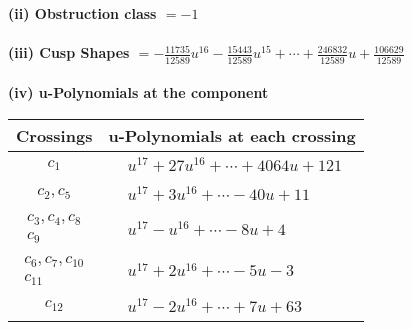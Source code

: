 \documentclass[1p]{elsarticle_modified}
\theoremstyle{definition}
\begin{document}
\flushleft \textbf{(ii) Obstruction class $= -1$}\\~\\
\flushleft \textbf{(iii) Cusp Shapes $= -\frac{11735}{12589} u^{16}-\frac{15443}{12589} u^{15}+\cdots+\frac{246832}{12589} u+\frac{106629}{12589}$}\\~\\
\newpage\renewcommand{\arraystretch}{1}
\flushleft \textbf{(iv) u-Polynomials at the component}\newline \\
\begin{tabular}{m{50pt}|m{274pt}}
Crossings & \hspace{64pt}u-Polynomials at each crossing \\
\hline $$\begin{aligned}c_{1}\end{aligned}$$&$\begin{aligned}
&u^{17}+27 u^{16}+\cdots+4064 u+121
\end{aligned}$\\
\hline $$\begin{aligned}c_{2},c_{5}\end{aligned}$$&$\begin{aligned}
&u^{17}+3 u^{16}+\cdots-40 u+11
\end{aligned}$\\
\hline $$\begin{aligned}c_{3},c_{4},c_{8}\\c_{9}\end{aligned}$$&$\begin{aligned}
&u^{17}- u^{16}+\cdots-8 u+4
\end{aligned}$\\
\hline $$\begin{aligned}c_{6},c_{7},c_{10}\\c_{11}\end{aligned}$$&$\begin{aligned}
&u^{17}+2 u^{16}+\cdots-5 u-3
\end{aligned}$\\
\hline $$\begin{aligned}c_{12}\end{aligned}$$&$\begin{aligned}
&u^{17}-2 u^{16}+\cdots+7 u+63
\end{aligned}$\\
\hline
\end{tabular}\\~\\
\newpage\renewcommand{\arraystretch}{1}
\end{document}
